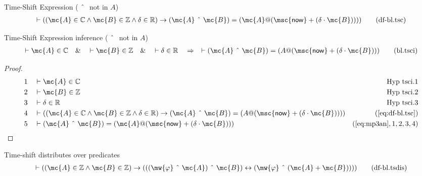 \begin{metadefinition} {Time-Shift Expression} ($~\string^~$
not in $A$)
\begin{align}
\vdash ( ( \mc{A} \in \mathbb{C} \wedge \mc{B} \in \mathbb{Z} \wedge \delta \in
    \mathbb{R} ) \rightarrow ( \mc{A} ~\string^~ \mc{B} ) = ( \mc{A} @ ( \mathsf{\msc{now}} +
    ( \delta \cdot \mc{B} ) ) ) )\label{eq:df-bl.tsc}\tag{df-bl.tsc}
\end{align}
\end{metadefinition}


\begin{lemma} {Time-Shift Expression inference}
($~\string^~$ not in $A$)
\begin{align}
\vdash \mc{A} \in \mathbb{C}\quad\&\quad \vdash \mc{B} \in \mathbb{Z}\quad\&\quad \vdash
    \delta \in \mathbb{R}\quad\Rightarrow\quad \vdash ( \mc{A} ~\string^~ \mc{B} ) = ( A
    @ ( \mathsf{\msc{now}} + ( \delta \cdot \mc{B} ) )
    )\label{eq:bl.tsci}\tag{bl.tsci}
\end{align}
\end{lemma}


\begin{proof}
\begin{align}
  1 &&  & \vdash \mc{A} \in \mathbb{C}&\text{Hyp~tsci.1}\notag%
  \\ 2 &&  & \vdash \mc{B} \in \mathbb{Z}&\text{Hyp~tsci.2}\notag%
  \\ 3 &&  & \vdash \delta \in \mathbb{R}&\text{Hyp~tsci.3}\notag%
  \\ 4 &&  & \vdash ( ( \mc{A} \in \mathbb{C} \wedge \mc{B} \in \mathbb{Z} \wedge \delta
     \in \mathbb{R} ) \rightarrow ( \mc{A} ~\string^~ \mc{B} ) = ( A
     @ ( \mathsf{\msc{now}} + ( \delta \cdot \mc{B} ) ) )
     )&(\mbox{\ref{eq:df-bl.tsc}})\notag
  \\ 5 &&  & \vdash ( \mc{A} ~\string^~ \mc{B} ) = ( \mc{A} @ ( \mathsf{\msc{now}} + ( \delta
     \cdot \mc{B} ) ) )&(\mbox{\ref{eq:mp3an}},1,2,3,4)\notag
\end{align}
\end{proof}

\begin{metadefinition} {Time-shift  distributes over predicates}
\begin{align}
\vdash ( ( \mc{A} \in \mathbb{Z} \wedge \mc{B} \in \mathbb{Z} ) \rightarrow ( ( (
    \mw{\varphi} ~\string^~ \mc{A} ) ~\string^~ \mc{B} ) \leftrightarrow ( \mw{\varphi}
    ~\string^~ ( \mc{A} + \mc{B} ) ) ) )\label{eq:df-bl.tsdis}\tag{df-bl.tsdis}
\end{align}
\end{metadefinition}


